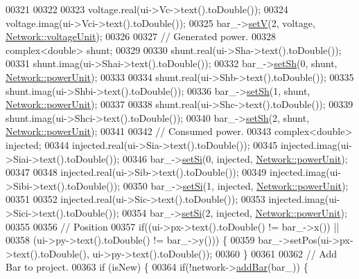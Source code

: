 \begin{DoxyCode}
00321 
00322 
00323   voltage.real(ui->Vc->text().toDouble());
00324   voltage.imag(ui->Vci->text().toDouble());
00325   bar\_->\hyperlink{group___models_ga9b6fbc92674bfcdc9d5090795ab335a6}{setV}(2, voltage, \hyperlink{group___graphics_gacde031ef95f5c05565ee35769f2ed89e}{Network::voltageUnit});
00326 
00327   \textcolor{comment}{// Generated power.}
00328   complex<double> shunt;
00329 
00330   shunt.real(ui->Sha->text().toDouble());
00331   shunt.imag(ui->Shai->text().toDouble());
00332   bar\_->\hyperlink{group___models_ga207abd3d0649a488e3c44cf2a501ed23}{setSh}(0, shunt, \hyperlink{group___graphics_ga9504015bc566f4a3d3b4d4a86000293b}{Network::powerUnit});
00333 
00334   shunt.real(ui->Shb->text().toDouble());
00335   shunt.imag(ui->Shbi->text().toDouble());
00336   bar\_->\hyperlink{group___models_ga207abd3d0649a488e3c44cf2a501ed23}{setSh}(1, shunt, \hyperlink{group___graphics_ga9504015bc566f4a3d3b4d4a86000293b}{Network::powerUnit});
00337 
00338   shunt.real(ui->Shc->text().toDouble());
00339   shunt.imag(ui->Shci->text().toDouble());
00340   bar\_->\hyperlink{group___models_ga207abd3d0649a488e3c44cf2a501ed23}{setSh}(2, shunt, \hyperlink{group___graphics_ga9504015bc566f4a3d3b4d4a86000293b}{Network::powerUnit});
00341 
00342   \textcolor{comment}{// Consumed power.}
00343   complex<double> injected;
00344   injected.real(ui->Sia->text().toDouble());
00345   injected.imag(ui->Siai->text().toDouble());
00346   bar\_->\hyperlink{group___models_ga74e510be49e50e4c14550b32e1dc92f9}{setSi}(0, injected, \hyperlink{group___graphics_ga9504015bc566f4a3d3b4d4a86000293b}{Network::powerUnit});
00347 
00348   injected.real(ui->Sib->text().toDouble());
00349   injected.imag(ui->Sibi->text().toDouble());
00350   bar\_->\hyperlink{group___models_ga74e510be49e50e4c14550b32e1dc92f9}{setSi}(1, injected, \hyperlink{group___graphics_ga9504015bc566f4a3d3b4d4a86000293b}{Network::powerUnit});
00351 
00352   injected.real(ui->Sic->text().toDouble());
00353   injected.imag(ui->Sici->text().toDouble());
00354   bar\_->\hyperlink{group___models_ga74e510be49e50e4c14550b32e1dc92f9}{setSi}(2, injected, \hyperlink{group___graphics_ga9504015bc566f4a3d3b4d4a86000293b}{Network::powerUnit});
00355 
00356   \textcolor{comment}{// Position}
00357   \textcolor{keywordflow}{if}((ui->px->text().toDouble() != bar\_->x()) ||
00358       (ui->py->text().toDouble() != bar\_->y())) \{
00359     bar\_->setPos(ui->px->text().toDouble(), ui->py->text().toDouble());
00360   \}
00361 
00362   \textcolor{comment}{// Add Bar to project.}
00363   \textcolor{keywordflow}{if} (isNew) \{
00364     \textcolor{keywordflow}{if}(!network->\hyperlink{group___graphics_ga8c5dfef0216731246f7411e1a5fbee01}{addBar}(bar\_)) \{

\end{DoxyCode}

